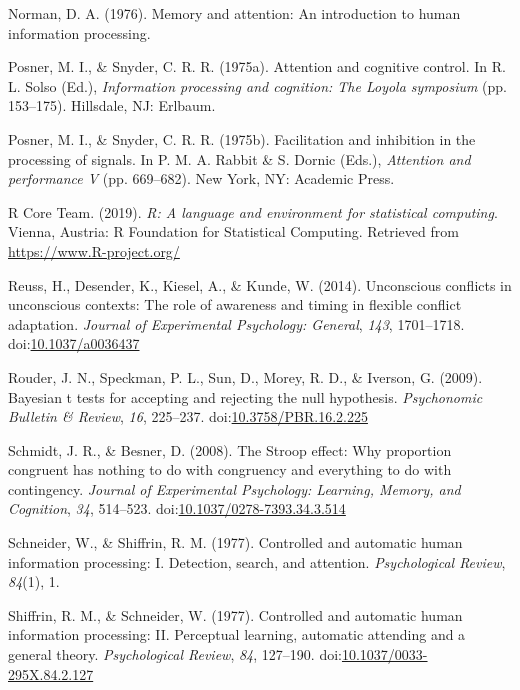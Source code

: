 \documentclass[english,,man,floatsintext]{apa6}
\begin{document}
\leavevmode\hypertarget{ref-norman_memory_1976}{}%
Norman, D. A. (1976). Memory and attention: An introduction to human information processing.

\leavevmode\hypertarget{ref-posner_attention_1975}{}%
Posner, M. I., \& Snyder, C. R. R. (1975a). Attention and cognitive control. In R. L. Solso (Ed.), \emph{Information processing and cognition: The Loyola symposium} (pp. 153--175). Hillsdale, NJ: Erlbaum.

\leavevmode\hypertarget{ref-posner_facilitation_1975}{}%
Posner, M. I., \& Snyder, C. R. R. (1975b). Facilitation and inhibition in the processing of signals. In P. M. A. Rabbit \& S. Dornic (Eds.), \emph{Attention and performance V} (pp. 669--682). New York, NY: Academic Press.

\leavevmode\hypertarget{ref-r_software_2019}{}%
R Core Team. (2019). \emph{R: A language and environment for statistical computing}. Vienna, Austria: R Foundation for Statistical Computing. Retrieved from \url{https://www.R-project.org/}

\leavevmode\hypertarget{ref-reuss_unconscious_2014}{}%
Reuss, H., Desender, K., Kiesel, A., \& Kunde, W. (2014). Unconscious conflicts in unconscious contexts: The role of awareness and timing in flexible conflict adaptation. \emph{Journal of Experimental Psychology: General}, \emph{143}, 1701--1718. doi:\href{https://doi.org/10.1037/a0036437}{10.1037/a0036437}

\leavevmode\hypertarget{ref-rouder_bayesian_2009}{}%
Rouder, J. N., Speckman, P. L., Sun, D., Morey, R. D., \& Iverson, G. (2009). Bayesian t tests for accepting and rejecting the null hypothesis. \emph{Psychonomic Bulletin \& Review}, \emph{16}, 225--237. doi:\href{https://doi.org/10.3758/PBR.16.2.225}{10.3758/PBR.16.2.225}

\leavevmode\hypertarget{ref-schmidt_stroop_2008}{}%
Schmidt, J. R., \& Besner, D. (2008). The Stroop effect: Why proportion congruent has nothing to do with congruency and everything to do with contingency. \emph{Journal of Experimental Psychology: Learning, Memory, and Cognition}, \emph{34}, 514--523. doi:\href{https://doi.org/10.1037/0278-7393.34.3.514}{10.1037/0278-7393.34.3.514}

\leavevmode\hypertarget{ref-schneider_controlled_1977}{}%
Schneider, W., \& Shiffrin, R. M. (1977). Controlled and automatic human information processing: I. Detection, search, and attention. \emph{Psychological Review}, \emph{84}(1), 1.

\leavevmode\hypertarget{ref-shiffrin_controlled_1977}{}%
Shiffrin, R. M., \& Schneider, W. (1977). Controlled and automatic human information processing: II. Perceptual learning, automatic attending and a general theory. \emph{Psychological Review}, \emph{84}, 127--190. doi:\href{https://doi.org/10.1037/0033-295X.84.2.127}{10.1037/0033-295X.84.2.127}
\end{document}
